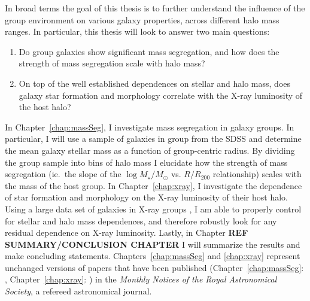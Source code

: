 In broad terms the goal of this thesis is to further understand the
influence of the group environment on various galaxy properties,
across different halo mass ranges.  In particular, this thesis will
look to answer two main questions:

\begin{enumerate}
  \item Do group galaxies show significant mass segregation, and how
    does the strength of mass segregation scale with halo mass?

  \item On top of the well established dependences on stellar and halo
    mass, does galaxy star formation and morphology correlate with the
    X-ray luminosity of the host halo?
\end{enumerate}

In Chapter~\ref{chap:massSeg}, I investigate mass segregation in galaxy
groups.  In particular, I will use a sample of galaxies in group from
the SDSS \citep{yang2005, yang2007} and determine the mean galaxy
stellar mass as a function of group-centric radius.  By dividing the
group sample into bins of halo mass I elucidate how the strength of
mass segregation (ie.\ the slope of the $\log M_\star/M_\odot$
vs. $R/R_{200}$ relationship) scales with the mass of the host group.
In Chapter~\ref{chap:xray}, I investigate the dependence of star
formation and morphology on the X-ray luminosity of their host halo.
Using a large data set of galaxies in X-ray groups \citep{wang2014}, I
am able to properly control for stellar and halo mass dependences, and
therefore robustly look for any residual dependence on X-ray
luminosity.  Lastly, in Chapter \textbf{REF SUMMARY/CONCLUSION
  CHAPTER} I will summarize the results and make concluding
statements.  Chapters~\ref{chap:massSeg} and \ref{chap:xray} represent
unchanged versions of papers that have been published
(Chapter~\ref{chap:massSeg}: \citealt{roberts2015},
Chapter~\ref{chap:xray}: \citealt{roberts2016a}) in the
\textit{Monthly Notices of the Royal Astronomical Society}, a refereed
astronomical journal.

%



